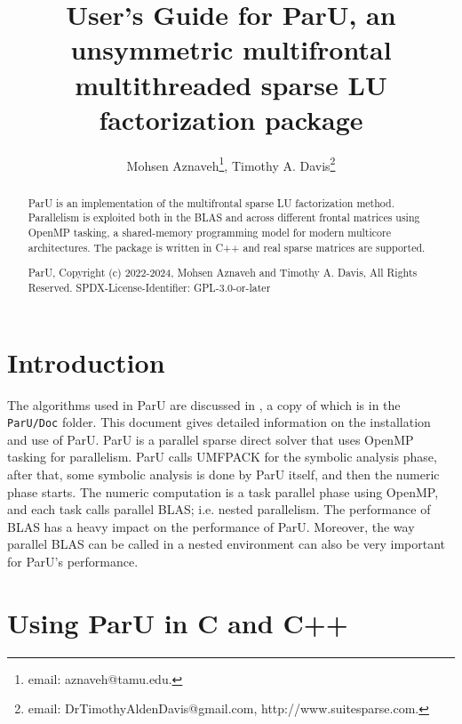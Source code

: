 \documentclass[12pt]{article}
\title{User's Guide for ParU, an unsymmetric multifrontal multithreaded sparse
LU factorization package}
\author{Mohsen Aznaveh\thanks{email: aznaveh@tamu.edu.},
Timothy A. Davis\thanks{email: DrTimothyAldenDavis@gmail.com,
http://www.suitesparse.com.}}
\begin{document}
\maketitle

\begin{abstract}

ParU is an implementation of the multifrontal sparse LU factorization method.
Parallelism is exploited both in the BLAS and across different frontal matrices
using OpenMP tasking, a shared-memory programming model for modern multicore
architectures. The package is written in C++ and real sparse matrices are
supported.

ParU, Copyright (c) 2022-2024, Mohsen Aznaveh and Timothy A. Davis,
All Rights Reserved.
SPDX-License-Identifier: GPL-3.0-or-later
\end{abstract}

\newpage
{\small
\tableofcontents
}

\section{Introduction}
\label{intro}

The algorithms used in ParU are discussed in \cite{AznavehThesis},
a copy of which is in the \verb'ParU/Doc' folder.
This document gives detailed information on the installation and use of ParU.
ParU is a parallel sparse direct solver that uses OpenMP tasking for
parallelism. ParU calls UMFPACK for the symbolic analysis phase, after that,
some symbolic analysis is done by ParU itself, and then the numeric phase
starts. The numeric computation is a task parallel phase using OpenMP, and each
task calls parallel BLAS; i.e. nested parallelism.  The performance of BLAS has
a heavy impact on the performance of ParU. Moreover, the way parallel BLAS can
be called in a nested environment can also be very important for ParU's
performance.

\section{Using ParU in C and C++}
\end{document}
